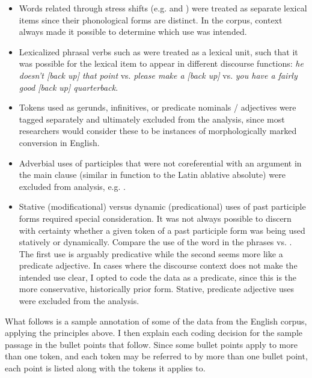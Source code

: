 \begin{itemize}

  \singlespacing

  \item Words related through stress shifts (e.g.  and ) were treated as separate lexical items since their phonological forms are distinct. In the corpus, context always made it possible to determine which use was intended.

  \item Lexicalized phrasal verbs such as  were treated as a lexical unit, such that it was possible for the lexical item to appear in different discourse functions: \textit{he doesn't [back up] that point} vs. \textit{please make a [back up]} vs. \textit{you have a fairly good [back up] quarterback}.

  \item Tokens used as gerunds, infinitives, or predicate nominals / adjectives were tagged separately and ultimately excluded from the analysis, since most researchers would consider these to be instances of morphologically marked conversion in English.

  \item Adverbial uses of participles that were not coreferential with an argument in the main clause (similar in function to the Latin ablative absolute) were excluded from analysis, e.g. .

  \item Stative (modificational) versus dynamic (predicational) uses of past participle forms required special consideration. It was not always possible to discern with certainty whether a given token of a past participle form was being used statively or dynamically. Compare the use of the word  in the phrases  vs. . The first use is arguably predicative while the second seems more like a predicate adjective. In cases where the discourse context does not make the intended use clear, I opted to code the data as a predicate, since this is the more conservative, historically prior form. Stative, predicate adjective uses were excluded from the analysis.

\end{itemize}

\clearpage

What follows is a sample annotation of some of the data from the English corpus, applying the principles above. I then explain each coding decision for the sample passage in the bullet points that follow. Since some bullet points apply to more than one token, and each token may be referred to by more than one bullet point, each point is listed along with the tokens it applies to.

